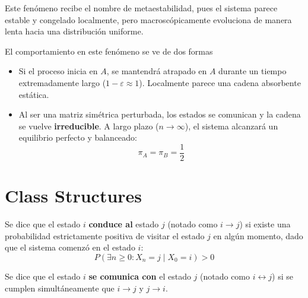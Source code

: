 \begin{observacion}
    Este fenómeno recibe el nombre de metaestabilidad, pues el sistema parece estable y congelado localmente, pero macroscópicamente evoluciona de manera lenta hacia una distribución uniforme.
\end{observacion}
El comportamiento en este fenómeno se ve de dos formas

\begin{itemize}
    \item {} Si el proceso inicia en $A$, se mantendrá atrapado en $A$ durante un tiempo extremadamente largo ($1-\varepsilon \approx 1$). Localmente parece una cadena absorbente estática.
    \item {} Al ser una matriz simétrica perturbada, los estados se comunican y la cadena se vuelve \textbf{irreducible}. A largo plazo ($n \to \infty$), el sistema alcanzará un equilibrio perfecto y balanceado:
    \[ 
    \pi_A = \pi_B = \frac{1}{2} 
    \]
\end{itemize}

\section{Class Structures}

\begin{definicion}
    Se dice que el estado $i$ \textbf{conduce al} estado $j$ (notado como $i \to j$) si existe una probabilidad estrictamente positiva de visitar el estado $j$ en algún momento, dado que el sistema comenzó en el estado $i$:
    \[
    P(\exists n \geq 0 : X_n = j \mid X_0 = i) > 0
    \]
\end{definicion}

\begin{definicion}[Comunicación]
Se dice que el estado $i$ \textbf{se comunica con} el estado $j$ (notado como $i \longleftrightarrow j$) si se cumplen simultáneamente que $i \to j$ y $j \to i$.
\end{definicion}

